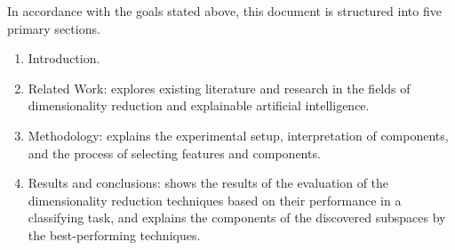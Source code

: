 In accordance with the goals stated above, this document is structured into five primary sections.
\begin{enumerate}
    \item Introduction.
    \item Related Work: explores existing literature and research in the fields of dimensionality reduction and explainable artificial intelligence.
    \item Methodology: explains the experimental setup, interpretation of components, and the process of selecting features and components.
    \item Results and conclusions: shows the results of the evaluation of the dimensionality reduction techniques based on their performance in a classifying task, and explains the components of the discovered subspaces by the best-performing techniques.
\end{enumerate}
